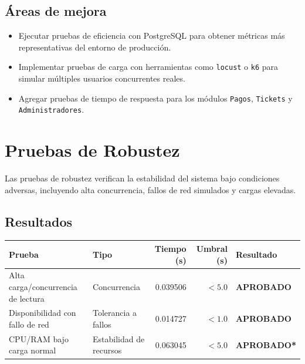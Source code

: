 \documentclass[12pt,a4paper]{article}
\newcommand{\aprobado}{\textcolor{aprobado}{\textbf{APROBADO}}}
\newcommand{\aprobadojust}{\textcolor{aprobadotodo}{\textbf{APROBADO*}}}
\begin{document}
\subsection{Áreas de mejora}

\begin{itemize}
  \item Ejecutar pruebas de eficiencia con PostgreSQL para obtener métricas más representativas
        del entorno de producción.
  \item Implementar pruebas de carga con herramientas como \texttt{locust} o \texttt{k6} para
        simular múltiples usuarios concurrentes reales.
  \item Agregar pruebas de tiempo de respuesta para los módulos \texttt{Pagos}, \texttt{Tickets}
        y \texttt{Administradores}.
\end{itemize}

\newpage
\section{Pruebas de Robustez}

Las pruebas de robustez verifican la estabilidad del sistema bajo condiciones adversas,
incluyendo alta concurrencia, fallos de red simulados y cargas elevadas.

\subsection{Resultados}

\begin{center}
\begin{tabularx}{\textwidth}{>{\raggedright}p{3.8cm} >{\raggedright}p{3cm} r r >{\centering\arraybackslash}p{2.2cm}}
\toprule
\textbf{Prueba} & \textbf{Tipo} & \textbf{Tiempo (s)} & \textbf{Umbral (s)} & \textbf{Resultado} \\
\midrule
Alta carga/concurrencia de lectura
  & Concurrencia
  & 0.039506
  & $< 5.0$
  & \aprobado \\
Disponibilidad con fallo de red
  & Tolerancia a fallos
  & 0.014727
  & $< 1.0$
  & \aprobado \\
CPU/RAM bajo carga normal
  & Estabilidad de recursos
  & 0.063045
  & $< 5.0$
  & \aprobadojust \\
\bottomrule
\end{tabularx}
\end{center}
\end{document}
